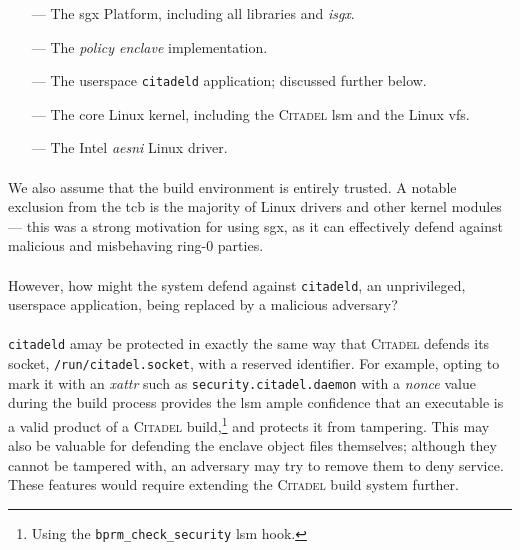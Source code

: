 \begin{itemize}
    \item[---] The \acrshort{sgx} Platform, including all libraries and \textit{isgx}. 
    \item[---] The \textit{policy enclave} implementation.
    \item[---] The userspace \texttt{citadeld} application; discussed further below.
    \item[---] The core Linux kernel, including the \textsc{Citadel} \acrshort{lsm} and the Linux \acrshort{vfs}.   
    \item[---] The Intel \textit{\acrshort{aesni}} Linux driver. 
\end{itemize}

\paragraph{} We also assume that the build environment is entirely trusted. A notable exclusion from the \acrshort{tcb} is the majority of Linux drivers and other kernel modules --- this was a strong motivation for using \acrshort{sgx}, as it can effectively defend against malicious and misbehaving ring-0 parties. 

\paragraph{} However, how might the system defend against \texttt{citadeld}, an un\-privileged, user\-space application, being replaced by a malicious adversary?


\paragraph{} \texttt{citadeld} amay be protected in exactly the same way that \textsc{Citadel} defends its socket, \texttt{/run/citadel.socket}, with a reserved identifier. For example, opting to mark it with an \textit{\acrshort{xattr}} such as \texttt{security.citadel.daemon} with a \textit{nonce} value during the build process provides the \acrshort{lsm} ample confidence that an executable is a valid product of a \textsc{Citadel} build,\footnote{Using the \texttt{bprm\_check\_security} \acrshort{lsm} hook.} and protects it from tampering. This may also be valuable for defending the enclave object files themselves; although they cannot be tampered with, an adversary may try to remove them to deny service. These features would require extending the \textsc{Citadel} build system further.

